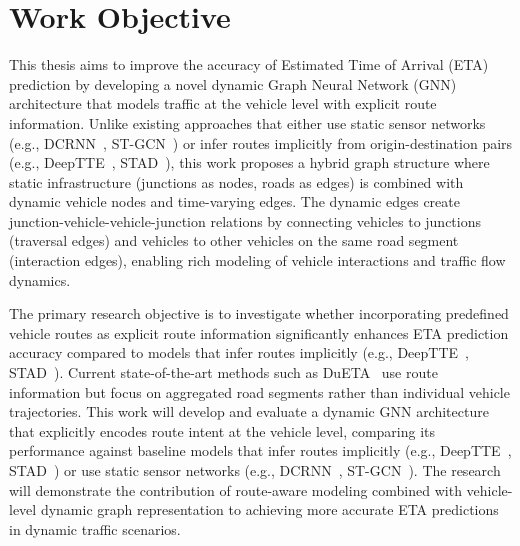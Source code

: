 \section{Work Objective}

This thesis aims to improve the accuracy of Estimated Time of Arrival (ETA) prediction by developing a novel dynamic Graph Neural Network (GNN) architecture that models traffic at the vehicle level with explicit route information. Unlike existing approaches that either use static sensor networks (e.g., DCRNN~\cite{dcrnn2018}, ST-GCN~\cite{yu2018stgcn}) or infer routes implicitly from origin-destination pairs (e.g., DeepTTE~\cite{deepTTE2018}, STAD~\cite{abbar2020stad}), this work proposes a hybrid graph structure where static infrastructure (junctions as nodes, roads as edges) is combined with dynamic vehicle nodes and time-varying edges. The dynamic edges create junction-vehicle-vehicle-junction relations by connecting vehicles to junctions (traversal edges) and vehicles to other vehicles on the same road segment (interaction edges), enabling rich modeling of vehicle interactions and traffic flow dynamics.

The primary research objective is to investigate whether incorporating predefined vehicle routes as explicit route information significantly enhances ETA prediction accuracy compared to models that infer routes implicitly (e.g., DeepTTE~\cite{deepTTE2018}, STAD~\cite{abbar2020stad}). Current state-of-the-art methods such as DuETA~\cite{dueta2023} use route information but focus on aggregated road segments rather than individual vehicle trajectories. This work will develop and evaluate a dynamic GNN architecture that explicitly encodes route intent at the vehicle level, comparing its performance against baseline models that infer routes implicitly (e.g., DeepTTE~\cite{deepTTE2018}, STAD~\cite{abbar2020stad}) or use static sensor networks (e.g., DCRNN~\cite{dcrnn2018}, ST-GCN~\cite{yu2018stgcn}). The research will demonstrate the contribution of route-aware modeling combined with vehicle-level dynamic graph representation to achieving more accurate ETA predictions in dynamic traffic scenarios.

